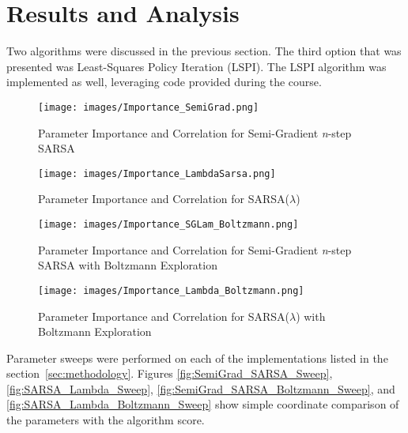 \documentclass[journal]{IEEEtran}
\begin{document}
\section{Results and Analysis}
\label{sec:results}
Two algorithms were discussed in the previous section. 
The third option that was presented was Least-Squares Policy Iteration (LSPI).
The LSPI algorithm was implemented as well, leveraging code provided during the course.

\begin{figure}[H]
  \texttt{[image: images/Importance\_SemiGrad.png]}
  \caption{Parameter Importance and Correlation for Semi-Gradient \emph{n}-step SARSA}
  \label{fig:SemiGrad_SARSA_Importance}
\end{figure}
\begin{figure}[H]
  \texttt{[image: images/Importance\_LambdaSarsa.png]}
  \caption{Parameter Importance and Correlation for SARSA(\(\lambda\))}
  \label{fig:SARSA_Lambda_Importance}
\end{figure}
\begin{figure}[H]
  \texttt{[image: images/Importance\_SGLam\_Boltzmann.png]}
  \caption{Parameter Importance and Correlation for Semi-Gradient \emph{n}-step 
  SARSA with Boltzmann Exploration}
  \label{fig:SemiGrad_SARSA_Boltz_Importance}
\end{figure}
\begin{figure}[H]
  \texttt{[image: images/Importance\_Lambda\_Boltzmann.png]}
  \caption{Parameter Importance and Correlation for SARSA(\(\lambda\)) with Boltzmann Exploration}
  \label{fig:SARSA_Lambda_Boltz_Importance}
\end{figure}

Parameter sweeps were performed on each of the implementations listed in the 
section~\ref{sec:methodology}. Figures \ref{fig:SemiGrad_SARSA_Sweep}, \ref{fig:SARSA_Lambda_Sweep},
\ref{fig:SemiGrad_SARSA_Boltzmann_Sweep}, and \ref{fig:SARSA_Lambda_Boltzmann_Sweep} 
show simple coordinate comparison of the parameters with the algorithm score.
\end{document}
